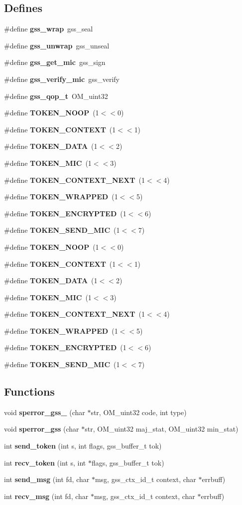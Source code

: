 \subsection*{Defines}
\begin{CompactItemize}
\item 
\#define {\bf gss\_\-wrap}\ gss\_\-seal
\item 
\#define {\bf gss\_\-unwrap}\ gss\_\-unseal
\item 
\#define {\bf gss\_\-get\_\-mic}\ gss\_\-sign
\item 
\#define {\bf gss\_\-verify\_\-mic}\ gss\_\-verify
\item 
\#define {\bf gss\_\-qop\_\-t}\ OM\_\-uint32
\item 
\#define {\bf TOKEN\_\-NOOP}\ (1$<$$<$0)
\item 
\#define {\bf TOKEN\_\-CONTEXT}\ (1$<$$<$1)
\item 
\#define {\bf TOKEN\_\-DATA}\ (1$<$$<$2)
\item 
\#define {\bf TOKEN\_\-MIC}\ (1$<$$<$3)
\item 
\#define {\bf TOKEN\_\-CONTEXT\_\-NEXT}\ (1$<$$<$4)
\item 
\#define {\bf TOKEN\_\-WRAPPED}\ (1$<$$<$5)
\item 
\#define {\bf TOKEN\_\-ENCRYPTED}\ (1$<$$<$6)
\item 
\#define {\bf TOKEN\_\-SEND\_\-MIC}\ (1$<$$<$7)
\item 
\#define {\bf TOKEN\_\-NOOP}\ (1$<$$<$0)
\item 
\#define {\bf TOKEN\_\-CONTEXT}\ (1$<$$<$1)
\item 
\#define {\bf TOKEN\_\-DATA}\ (1$<$$<$2)
\item 
\#define {\bf TOKEN\_\-MIC}\ (1$<$$<$3)
\item 
\#define {\bf TOKEN\_\-CONTEXT\_\-NEXT}\ (1$<$$<$4)
\item 
\#define {\bf TOKEN\_\-WRAPPED}\ (1$<$$<$5)
\item 
\#define {\bf TOKEN\_\-ENCRYPTED}\ (1$<$$<$6)
\item 
\#define {\bf TOKEN\_\-SEND\_\-MIC}\ (1$<$$<$7)
\end{CompactItemize}
\subsection*{Functions}
\begin{CompactItemize}
\item 
void {\bf sperror\_\-gss\_} (char $\ast$str, OM\_\-uint32 code, int type)
\item 
void {\bf sperror\_\-gss} (char $\ast$str, OM\_\-uint32 maj\_\-stat, OM\_\-uint32 min\_\-stat)
\item 
int {\bf send\_\-token} (int s, int flags, gss\_\-buffer\_\-t tok)
\item 
int {\bf recv\_\-token} (int s, int $\ast$flags, gss\_\-buffer\_\-t tok)
\item 
int {\bf send\_\-msg} (int fd, char $\ast$msg, gss\_\-ctx\_\-id\_\-t context, char $\ast$errbuff)
\item 
int {\bf recv\_\-msg} (int fd, char $\ast$msg, gss\_\-ctx\_\-id\_\-t context, char $\ast$errbuff)
\end{CompactItemize}
